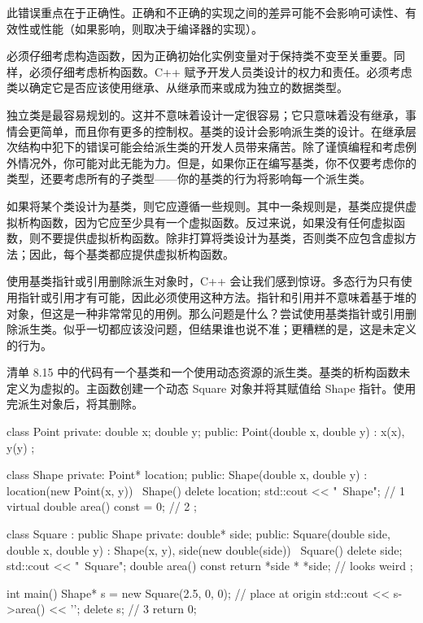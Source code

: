 此错误重点在于正确性。正确和不正确的实现之间的差异可能不会影响可读性、有效性或性能（如果影响，则取决于编译器的实现）。

必须仔细考虑构造函数，因为正确初始化实例变量对于保持类不变至关重要。同样，必须仔细考虑析构函数。C++ 赋予开发人员类设计的权力和责任。必须考虑类以确定它是否应该使用继承、从继承而来或成为独立的数据类型。


独立类是最容易规划的。这并不意味着设计一定很容易；它只意味着没有继承，事情会更简单，而且你有更多的控制权。基类的设计会影响派生类的设计。在继承层次结构中犯下的错误可能会给派生类的开发人员带来痛苦。除了谨慎编程和考虑例外情况外，你可能对此无能为力。但是，如果你正在编写基类，你不仅要考虑你的类型，还要考虑所有的子类型——你的基类的行为将影响每一个派生类。

如果将某个类设计为基类，则它应遵循一些规则。其中一条规则是，基类应提供虚拟析构函数，因为它应至少具有一个虚拟函数。反过来说，如果没有任何虚拟函数，则不要提供虚拟析构函数。除非打算将类设计为基类，否则类不应包含虚拟方法；因此，每个基类都应提供虚拟析构函数。

使用基类指针或引用删除派生对象时，C++ 会让我们感到惊讶。多态行为只有使用指针或引用才有可能，因此必须使用这种方法。指针和引用并不意味着基于堆的对象，但这是一种非常常见的用例。那么问题是什么？尝试使用基类指针或引用删除派生类。似乎一切都应该没问题，但结果谁也说不准；更糟糕的是，这是未定义的行为。

清单 8.15 中的代码有一个基类和一个使用动态资源的派生类。基类的析构函数未定义为虚拟的。主函数创建一个动态 Square 对象并将其赋值给 Shape 指针。使用完派生对象后，将其删除。


\begin{cpp}
class Point {
private:
  double x;
  double y;
public:
  Point(double x, double y) : x(x), y(y) {}
};

class Shape {
private:
  Point* location;
public:
  Shape(double x, double y) : location(new Point(x, y)) {}
  ~Shape() { delete location; std::cout << "~Shape\n"; } // 1
  virtual double area() const = 0; // 2
};

class Square : public Shape {
private:
  double* side;
public:
  Square(double side, double x, double y) : Shape(x, y),
  side(new double(side)) {}
  ~Square() { delete side; std::cout << "~Square\n"; }
  double area() const { return *side * *side; } // looks weird
};

int main() {
  Shape* s = new Square(2.5, 0, 0); // place at origin
  std::cout << s->area() << '\n';
  delete s; // 3
  return 0;
}
\end{cpp}

